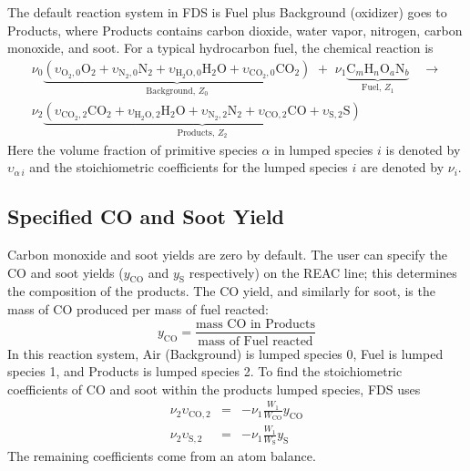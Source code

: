 The default reaction system in FDS is Fuel plus Background (oxidizer) goes to Products, where Products contains carbon dioxide, water vapor, nitrogen, carbon monoxide, and soot. For a typical hydrocarbon fuel, the chemical reaction is
\begin{multline}\label{eq:full_lump}
\nu_{0}\underbrace{(\upsilon_{\mathrm{O}_{2},0}\mathrm{O}_2 +\upsilon_{\mathrm{N}_{2},0}\mathrm{N}_2 + \upsilon_{\mathrm{H}_{2}\mathrm{O},0}\mathrm{H}_2\mathrm{O}+\upsilon_{\mathrm{CO}_{2},0}\mathrm{CO}_2)}_\text{Background,~$Z_0$} \,\,+ \,\, \nu_{1}\underbrace{\mbox{C}_m\mbox{H}_n\mbox{O}_a\mbox{N}_b}_\text{Fuel,~$Z_1$} \quad \longrightarrow \\
\nu_{2}\underbrace{(\upsilon_{\mathrm{CO}_{2},2}\mathrm{CO}_2+\upsilon_{\mathrm{H}_{2}\mathrm{O},2}\mathrm{H}_2\mathrm{O}+\upsilon_{\mathrm{N}_{2},2}\mathrm{N}_2+\upsilon_{\mathrm{CO},2}\mathrm{CO}+\upsilon_{\mathrm{S},2}\mathrm{S})}_\text{Products,~$Z_2$}
\end{multline}
Here the volume fraction of primitive species $\alpha$ in lumped species $i$ is denoted by $\upsilon_{\alpha\,i}$ and the stoichiometric coefficients for the lumped species $i$ are denoted by $\nu_{i}$.

\subsection{Specified CO and Soot Yield}

Carbon monoxide and soot yields are zero by default. The user can specify the CO and soot yields ($y_{\mathrm{CO}}$ and $y_{\mathrm{S}}$ respectively) on the {\ct REAC} line; this determines the composition of the products. The CO yield, and similarly for soot, is the mass of CO produced per mass of fuel reacted:
\begin{equation}\label{eq:y_co}
y_\mathrm{CO} = \frac{\mbox{mass CO in Products}}{\mbox{mass of Fuel reacted}}
\end{equation}
In this reaction system, Air (Background) is lumped species 0, Fuel is lumped species 1, and Products is lumped species 2. To find the stoichiometric coefficients of CO and soot within the products lumped species, FDS uses
\begin{eqnarray}\label{eq:yields}
\nu_{2}\upsilon_{\mathrm{CO},2}&=&-\nu_{1}\frac{W_1}{W_{\mathrm{CO}}}y_{\mathrm{CO}} \\
\nu_{2}\upsilon_{\mathrm{S},2}&=&-\nu_{1}\frac{W_1}{W_{\mathrm{S}}}y_{\mathrm{S}}
\end{eqnarray}
The remaining coefficients come from an atom balance.

